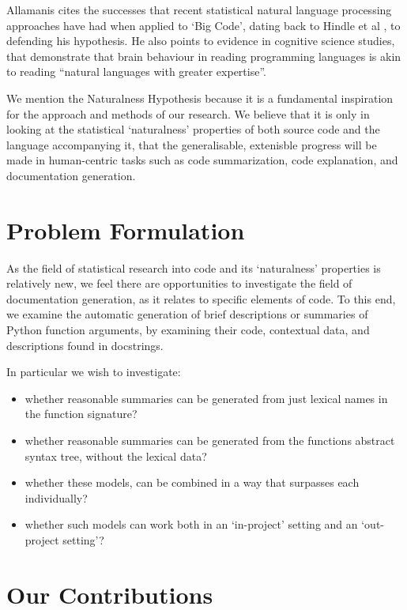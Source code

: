 Allamanis cites the successes that recent statistical natural language processing approaches have had when applied to `Big Code', dating back to Hindle et al \cite{hindle_naturalness_nodate}, to defending his hypothesis. He also points to evidence in cognitive science studies, that demonstrate that brain behaviour in reading programming languages is akin to reading ``natural languages with greater expertise''\cite{floyd_decoding_2017}.

We mention the Naturalness Hypothesis because it is a fundamental inspiration for the approach and methods of our research.
We believe that it is only in looking at the statistical `naturalness' properties of both source code and the language accompanying it, that the generalisable, extenisble progress will be made in human-centric tasks such as code summarization, code explanation, and documentation generation.


\section{Problem Formulation} %
\label{sec:problem_formulation}

As the field of statistical research into code and its `naturalness' properties is relatively new, we feel there are opportunities to investigate the field of documentation generation, as it relates to specific elements of code. 
To this end, we examine the automatic generation of brief descriptions or summaries of Python function arguments, by examining their code, contextual data, and descriptions found in docstrings.

In particular we wish to investigate:
\begin{itemize}
    \item whether reasonable summaries can be generated from just lexical names in the function signature?
    \item whether reasonable summaries can be generated from the functions abstract syntax tree, without the lexical data?
    \item whether these models, can be combined in a way that surpasses each individually?
    \item whether such models can work both in an `in-project' setting and an `out-project setting'?
\end{itemize}
 
\section{Our Contributions}

